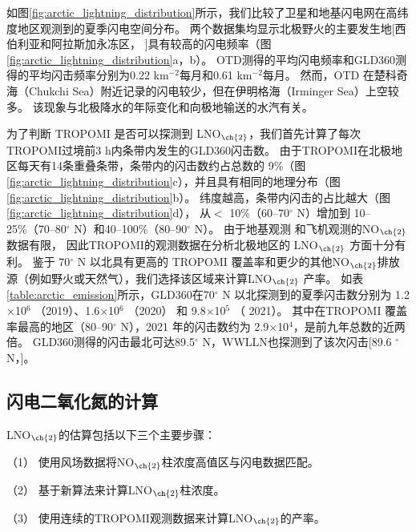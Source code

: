 如图\ref{fig:arctic_lightning_distribution}所示，我们比较了卫星和地基闪电网在高纬度地区观测到的夏季闪电空间分布。
两个数据集均显示北极野火的主要发生地[西伯利亚和阿拉斯加永冻区，
\citep{McCarty.2021}]具有较高的闪电频率（图\ref{fig:arctic_lightning_distribution}a，b）。
OTD测得的平均闪电频率和GLD360测得的平均闪击频率分别为0.22 km$^{-2}$每月和0.61 km$^{-2}$每月。
然而，OTD 在楚科奇海（Chukchi Sea）附近记录的闪电较少，但在伊明格海（Irminger Sea）上空较多。
该现象与北极降水的年际变化和向极地输送的水汽有关\citep{Bintanja.2020}。

为了判断 TROPOMI 是否可以探测到 LNO$_{\ch{2}}$，我们首先计算了每次TROPOMI过境前3 h内条带内发生的GLD360闪击数。
由于TROPOMI在北极地区每天有14条重叠条带，条带内的闪击数约占总数的 9\%（图\ref{fig:arctic_lightning_distribution}c），并且具有相同的地理分布（图\ref{fig:arctic_lightning_distribution}b）。
纬度越高，条带内闪击的占比越大（图\ref{fig:arctic_lightning_distribution}d），
从$<$ 10\%（60--70$^{\circ}$ N）增加到 10--25\%（70--80$^{\circ}$ N）和40--100\%（80--90$^{\circ}$ N）。
由于地基观测\citep{Schmale.2018} 和飞机观测\citep{Jacob.2010}的NO$_{\ch{2}}$数据有限，
因此TROPOMI的观测数据在分析北极地区的 LNO$_{\ch{2}}$ 方面十分有利。
鉴于 70$^{\circ}$ N 以北具有更高的 TROPOMI 覆盖率和更少的其他NO$_{\ch{2}}$排放源（例如野火或天然气），我们选择该区域来计算LNO$_{\ch{2}}$ 产率。
如表\ref{table:arctic_emission}所示，GLD360在70$^{\circ}$ N 以北探测到的夏季闪击数分别为 1.2$\times$10$^6$ （2019）、1.6$\times$10$^6$ （2020） 和 9.8$\times$10$^5$ （ 2021）。
其中在TROPOMI 覆盖率最高的地区（80--90$^{\circ}$ N），2021 年的闪击数约为 2.9$\times$10$^4$，是前九年总数的近两倍\citep{networktotal.2021}。
GLD360测得的闪击最北可达89.5$^{\circ}$ N，WWLLN也探测到了该次闪击[89.6 $^{\circ}$ N，\citet{Holzworth.2021}]。

\subsection{闪电二氧化氮的计算} \label{sec:arctic_lnox_calc}

LNO$_{\ch{2}}$的估算包括以下三个主要步骤：

（1） 使用风场数据将NO$_{\ch{2}}$柱浓度高值区与闪电数据匹配。

（2） 基于新算法来计算LNO$_{\ch{2}}$柱浓度。

（3） 使用连续的TROPOMI观测数据来计算LNO$_{\ch{2}}$的产率。

